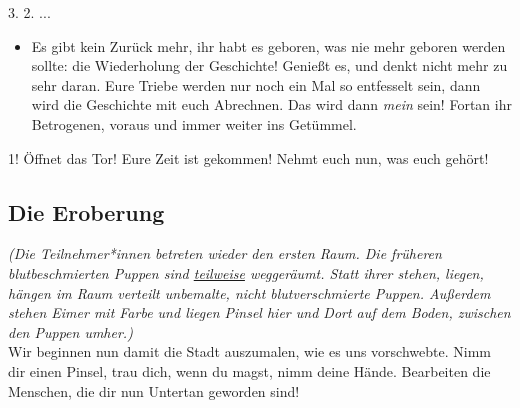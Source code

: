 \documentclass[a4paper, 12pt]{report}
\begin{document}
3. 2. ...

\begin{itemize}\em
\item[] Es gibt kein Zurück mehr, ihr habt es geboren, was nie mehr geboren werden sollte: die Wiederholung der Geschichte!
    Genießt es, und denkt nicht mehr zu sehr daran.
    Eure Triebe werden nur noch ein Mal so entfesselt sein, dann wird die Geschichte mit euch Abrechnen. 
    Das wird dann \emph{mein}  sein!
    Fortan ihr Betrogenen, voraus und immer weiter ins Getümmel.
\end{itemize}

1! 
Öffnet das Tor! 
Eure Zeit ist gekommen! 
Nehmt euch nun, was euch gehört!


\subsection{Die Eroberung}
\textit{(Die Teilnehmer*innen betreten wieder den ersten Raum. 
Die früheren blutbeschmierten Puppen sind \hyperref[zahl_der_puppen]{teilweise} weggeräumt.
Statt ihrer stehen, liegen, hängen im Raum verteilt unbemalte, nicht blutverschmierte Puppen.
Außerdem stehen Eimer mit Farbe und liegen Pinsel hier und Dort auf dem Boden, zwischen den Puppen umher.)}\\

Wir beginnen nun damit die Stadt auszumalen, wie es uns vorschwebte.
Nimm dir einen Pinsel, trau dich, wenn du magst, nimm deine Hände. 
Bearbeiten die Menschen, die dir nun Untertan geworden sind!\\
\end{document}
